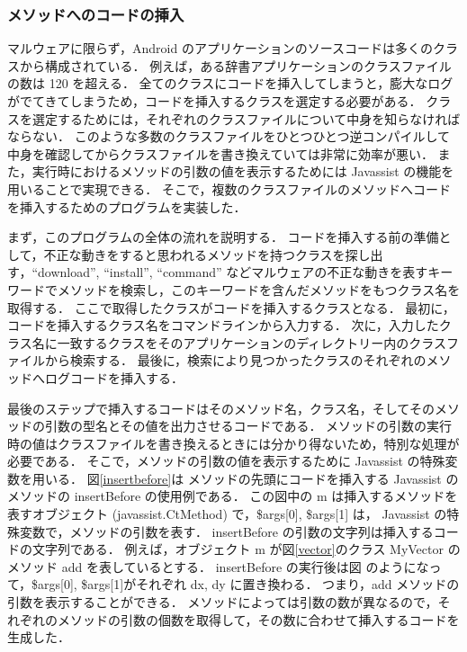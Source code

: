 \subsubsection{メソッドへのコードの挿入}
\label{insertcodes}
マルウェアに限らず，Android のアプリケーションのソースコードは多くのクラスから構成されている．
例えば，ある辞書アプリケーションのクラスファイルの数は 120 を超える．
全てのクラスにコードを挿入してしまうと，膨大なログがでてきてしまうため，コードを挿入するクラスを選定する必要がある．
クラスを選定するためには，それぞれのクラスファイルについて中身を知らなければならない．
このような多数のクラスファイルをひとつひとつ逆コンパイルして中身を確認してからクラスファイルを書き換えていては非常に効率が悪い．
また，実行時におけるメソッドの引数の値を表示するためには Javassist の機能を用いることで実現できる．
そこで，複数のクラスファイルのメソッドへコードを挿入するためのプログラムを実装した．

まず，このプログラムの全体の流れを説明する．
コードを挿入する前の準備として，不正な動きをすると思われるメソッドを持つクラスを探し出す，``download'', ``install'', ``command'' などマルウェアの不正な動きを表すキーワードでメソッドを検索し，このキーワードを含んだメソッドをもつクラス名を取得する．
ここで取得したクラスがコードを挿入するクラスとなる．
最初に，コードを挿入するクラス名をコマンドラインから入力する．
次に，入力したクラス名に一致するクラスをそのアプリケーションのディレクトリー内のクラスファイルから検索する．
最後に，検索により見つかったクラスのそれぞれのメソッドへログコードを挿入する．

最後のステップで挿入するコードはそのメソッド名，クラス名，そしてそのメソッドの引数の型名とその値を出力させるコードである．
メソッドの引数の実行時の値はクラスファイルを書き換えるときには分かり得ないため，特別な処理が必要である．
そこで，メソッドの引数の値を表示するために Javassist の特殊変数を用いる．
図\ref{insertbefore}は メソッドの先頭にコードを挿入する Javassist のメソッドの insertBefore の使用例である．
この図中の m は挿入するメソッドを表すオブジェクト (javassist.CtMethod) で，\$args[0], \$args[1] は， Javassist の特殊変数で，メソッドの引数を表す．
insertBefore の引数の文字列は挿入するコードの文字列である．
例えば，オブジェクト m が図\ref{vector}のクラス MyVector のメソッド add を表しているとする．
insertBefore の実行後は図 のようになって，\$args[0], \$args[1]がそれぞれ dx, dy に置き換わる．
つまり，add メソッドの引数を表示することができる．
メソッドによっては引数の数が異なるので，それぞれのメソッドの引数の個数を取得して，その数に合わせて挿入するコードを生成した．

